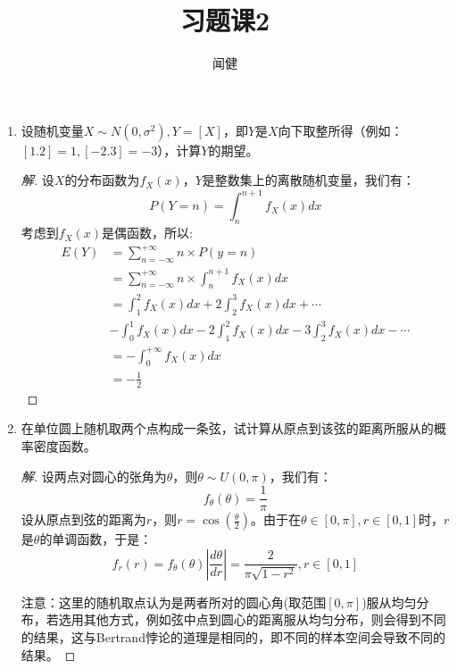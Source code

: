 \documentclass[12pt]{article}
\newcommand{\hei}{\CJKfamily{hei}}                          %
\begin{document}
\author{闻健}
\title{习题课2}
\maketitle

\medskip

\begin{enumerate}

\item {\hei 设随机变量$X\sim N(0,\sigma^2),Y=[X]$，即$Y$是$X$向下取整所得（例如：$[1.2]=1,[-2.3]=-3$），计算$Y$的期望。}
\begin{proof}[解]
	设$X$的分布函数为$f_X(x)$，$Y$是整数集上的离散随机变量，我们有：
	\begin{equation}
	P(Y=n)=\int_{n}^{n+1}f_X(x)dx
	\end{equation}
	考虑到$f_X(x)$是偶函数，所以:
	\begin{equation}
	\begin{aligned}
		E(Y)&=\sum_{n=-\infty}^{+\infty}n\times P(y=n) \\
		&=\sum_{n=-\infty}^{+\infty}n\times\int_{n}^{n+1}f_X(x)dx \\
		&=\int_{1}^{2}f_X(x)dx+2\int_{2}^{3}f_X(x)dx+\cdots\\
		&-\int_{0}^{1}f_X(x)dx-2\int_{1}^{2}f_X(x)dx-3\int_{2}^{3}f_X(x)dx-\cdots \\
		&=-\int_{0}^{+\infty}f_X(x)dx \\
		&=-\frac{1}{2}
	\end{aligned}
	\end{equation}
\end{proof}

\item {\hei 在单位圆上随机取两个点构成一条弦，试计算从原点到该弦的距离所服从的概率密度函数。}
\begin{proof}[解]
	设两点对圆心的张角为$\theta$，则$\theta\sim U(0,\pi)$，我们有：
	\begin{equation}
	f_\theta(\theta)=\frac{1}{\pi}
	\end{equation}
	设从原点到弦的距离为$r$，则$r=\cos\left(\displaystyle{\frac{\theta}{2}}\right)$。由于在$\theta\in[0,\pi],r\in[0,1]$时，$r$是$\theta$的单调函数，于是：
	\begin{equation}
	f_r(r)=f_\theta(\theta)\left|\frac{d\theta}{dr}\right|=\frac{2}{\pi\sqrt{1-r^2}},r\in[0,1]
	\end{equation}
	
	{\hei 注意}：这里的随机取点认为是两者所对的圆心角(取范围$[0,\pi]$)服从均匀分布，若选用其他方式，例如弦中点到圆心的距离服从均匀分布，则会得到不同的结果，这与Bertrand悖论的道理是相同的，即不同的样本空间会导致不同的结果。
\end{proof}





\end{enumerate}
\end{document}
